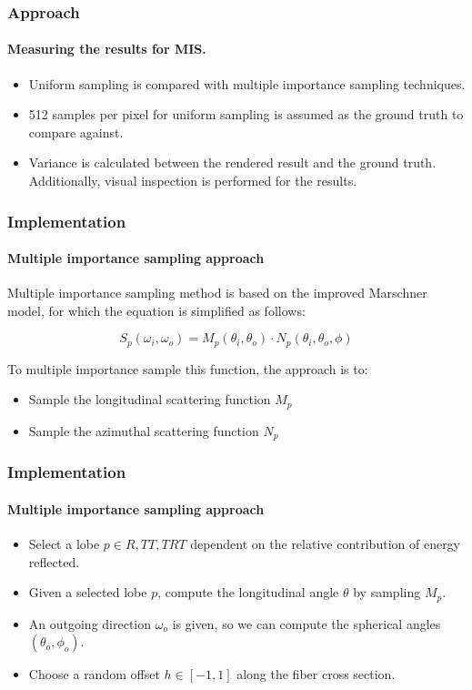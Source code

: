 \documentclass{beamer}
\begin{document}
  \begin{frame}
  \frametitle{Approach}
  \framesubtitle{Measuring the results for MIS.}
  
  \begin{itemize}
  \item Uniform sampling is compared with multiple importance sampling techniques.
  \item 512 samples per pixel for uniform sampling is assumed as the ground truth to compare against.
  \item Variance is calculated between the rendered result and the ground truth. Additionally, visual inspection is performed for the results.
  \end{itemize}
 
  \end{frame}
  
\begin{frame}
    \frametitle{Implementation}
    \framesubtitle{Multiple importance sampling approach}
    
    Multiple importance sampling method is based on the improved Marschner model, for which the equation is simplified as follows:
    
    \begin{equation}
    S_p(\omega_i, \omega_o) = M_p(\theta_i, \theta_o) \cdot N_p(\theta_i, \theta_o, \phi)
    \end{equation}
    
    To multiple importance sample this function, the approach is to:
    \begin{itemize}
    \item Sample the longitudinal scattering function $M_p$
    \item Sample the azimuthal scattering function $N_p$
    \end{itemize}
        
  \end{frame}  
  
  \begin{frame}
    \frametitle{Implementation}
    \framesubtitle{Multiple importance sampling approach}
    
    \begin{itemize}
    \item Select a lobe $p \in {R, TT, TRT}$ dependent on the relative contribution of energy reflected.
    \item Given a selected lobe $p$, compute the longitudinal angle $\theta$ by sampling $M_p$.
    \item An outgoing direction $\omega_o$ is given, so we can compute the spherical angles $(\theta_o, \phi_o)$.
    \item Choose a random offset $h \in [-1, 1]$ along the fiber cross section.
    \end{itemize}
    
  \end{frame}
  
\end{document}
